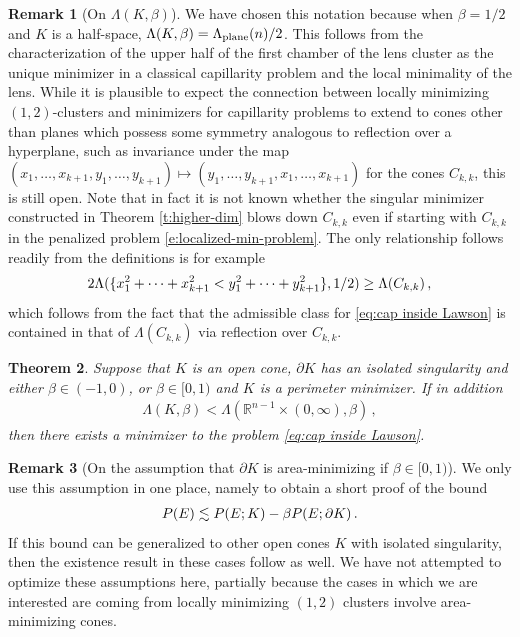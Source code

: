 \documentclass[10pt,reqno]{amsart}
\numberwithin{equation}{section}
\newtheorem{theorem}{Theorem}[section]
\theoremstyle{definition}
\newtheorem{remark}[theorem]{Remark}
\begin{document}
{{\begin{remark}[On $\Lambda(K,\beta)$]
    We have chosen this notation because when $\beta=1/2$ and $K$ is a half-space, $\Lambda(K,\beta) = \Lambda_{\rm plane}(n)/2$. This follows from the characterization of the upper half of the first chamber of the lens cluster as the unique minimizer in a classical capillarity problem \cite[Theorem 3.4]{BroNov24} and the local minimality of the lens. While it is plausible to expect the connection between locally minimizing $(1,2)$-clusters and minimizers for capillarity problems to extend to cones other than planes which possess some symmetry analogous to reflection over a hyperplane, such as invariance under the map $(x_1,\dots,x_{k+1},y_{1},\dots,y_{k+1})\mapsto (y_1,\dots,y_{k+1},x_{1},\dots,x_{k+1})$ for the cones $C_{k,k}$, this is still open. Note that in fact it is not known whether the singular minimizer constructed in Theorem \ref{t:higher-dim} blows down $C_{k,k}$ even if starting with $C_{k,k}$ in the penalized problem \eqref{e:localized-min-problem}. The only relationship follows readily from the definitions is for example
    \begin{align}\notag
        2\Lambda(\{x_1^2 + \dots + x_{k+1}^2 < y_1^2 + \dots + y_{k+1}^2\},1/2) \geq \Lambda(C_{k,k})\,,
    \end{align}
    which follows from the fact that the admissible class for \eqref{eq:cap inside Lawson} is contained in that of $\Lambda(C_{k,k})$ via reflection over $C_{k,k}$.
\end{remark}

\begin{theorem}\label{t:capillary}
    Suppose that $K$ is an open cone, $\partial K$ has an isolated singularity and either $\beta\in (-1,0)$, or $\beta \in [0,1)$ and $K$ is a perimeter minimizer. If in addition
    \begin{align}\label{eq:suff cond for existence of cap}
    \Lambda(K,\beta)<\Lambda(\mathbb{R}^{n-1}\times (0,\infty),\beta) \,,   
    \end{align}
    then there exists a minimizer to the problem \eqref{eq:cap inside Lawson}. 
\end{theorem}
\begin{remark}[On the assumption that $\partial K$ is area-minimizing if $\beta \in [0,1)$]
    We only use this assumption in one place, namely to obtain a short proof of the bound 
    \begin{align}\notag
        P(E) \lesssim P(E;K) - \beta P(E;\partial K) \,. \end{align}
    If this bound can be generalized to other open cones $K$ with isolated singularity, then the existence result in these cases follow as well. We have not attempted to optimize these assumptions here, partially because the cases in which we are interested are coming from locally minimizing $(1,2)$ clusters involve area-minimizing cones.
\end{remark}

}}
\end{document}

